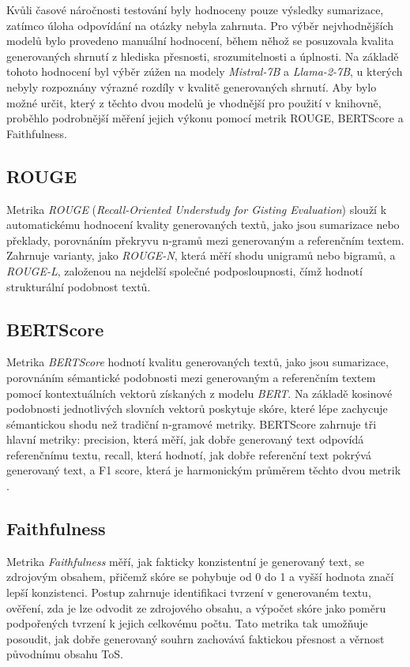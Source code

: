 Kvůli časové náročnosti testování byly hodnoceny pouze výsledky sumarizace, zatímco úloha odpovídání na otázky nebyla zahrnuta.
Pro výběr nejvhodnějších modelů bylo provedeno manuální hodnocení, během něhož se posuzovala kvalita generovaných shrnutí z hlediska přesnosti, srozumitelnosti a úplnosti.
Na základě tohoto hodnocení byl výběr zúžen na modely \textit{Mistral-7B} a \textit{Llama-2-7B}, u kterých nebyly rozpoznány výrazné rozdíly v kvalitě generovaných shrnutí.
Aby bylo možné určit, který z těchto dvou modelů je vhodnější pro použití v knihovně, proběhlo podrobnější měření jejich výkonu pomocí metrik ROUGE, BERTScore a Faithfulness.

\subsection{ROUGE}
Metrika \textit{ROUGE} (\textit{Recall-Oriented Understudy for Gisting Evaluation}) slouží k automatickému hodnocení kvality generovaných textů, jako jsou sumarizace nebo překlady, porovnáním překryvu n-gramů mezi generovaným a referenčním textem.
Zahrnuje varianty, jako \textit{ROUGE-N}, která měří shodu unigramů nebo bigramů, a \textit{ROUGE-L}, založenou na nejdelší společné podposloupnosti, čímž hodnotí strukturální podobnost textů. \cite{lin-2004-rouge}

\subsection{BERTScore}
Metrika \textit{BERTScore} hodnotí kvalitu generovaných textů, jako jsou sumarizace, porovnáním sémantické podobnosti mezi generovaným a referenčním textem pomocí kontextuálních vektorů získaných z modelu \textit{BERT}.
Na základě kosinové podobnosti jednotlivých slovních vektorů poskytuje skóre, které lépe zachycuje sémantickou shodu než tradiční n-gramové metriky.
BERTScore zahrnuje tři hlavní metriky: precision, která měří, jak dobře generovaný text odpovídá referenčnímu textu, recall, která hodnotí, jak dobře referenční text pokrývá generovaný text, a F1 score, která je harmonickým průměrem těchto dvou metrik \cite{zhang2020bertscoreevaluatingtextgeneration}.

\subsection{Faithfulness}
Metrika \textit{Faithfulness} měří, jak fakticky konzistentní je generovaný text, se zdrojovým obsahem, přičemž skóre se pohybuje od 0 do 1 a vyšší hodnota značí lepší konzistenci.
Postup zahrnuje identifikaci tvrzení v generovaném textu, ověření, zda je lze odvodit ze zdrojového obsahu, a výpočet skóre jako poměru podpořených tvrzení k jejich celkovému počtu. \cite{ragasFaithfulnessRagas}
Tato metrika tak umožňuje posoudit, jak dobře generovaný souhrn zachovává faktickou přesnost a věrnost původnímu obsahu ToS.

